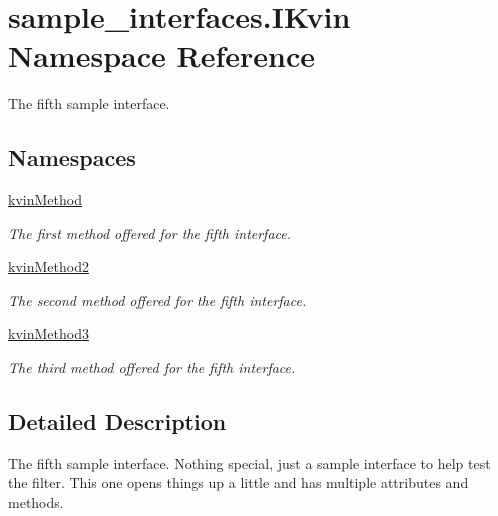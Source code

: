 \hypertarget{namespacesample__interfaces_1_1_i_kvin}{\section{sample\-\_\-interfaces.\-I\-Kvin Namespace Reference}
\label{namespacesample__interfaces_1_1_i_kvin}
}


The fifth sample interface.  


\subsection*{Namespaces}
\begin{DoxyCompactItemize}
\item 
\hyperlink{namespacesample__interfaces_1_1_i_kvin_1_1kvin_method}{kvin\-Method}
\begin{DoxyCompactList}\small\item\em The first method offered for the fifth interface. \end{DoxyCompactList}\item 
\hyperlink{namespacesample__interfaces_1_1_i_kvin_1_1kvin_method2}{kvin\-Method2}
\begin{DoxyCompactList}\small\item\em The second method offered for the fifth interface. \end{DoxyCompactList}\item 
\hyperlink{namespacesample__interfaces_1_1_i_kvin_1_1kvin_method3}{kvin\-Method3}
\begin{DoxyCompactList}\small\item\em The third method offered for the fifth interface. \end{DoxyCompactList}\end{DoxyCompactItemize}


\subsection{Detailed Description}
The fifth sample interface. Nothing special, just a sample interface to help test the filter. This one opens things up a little and has multiple attributes and methods. 